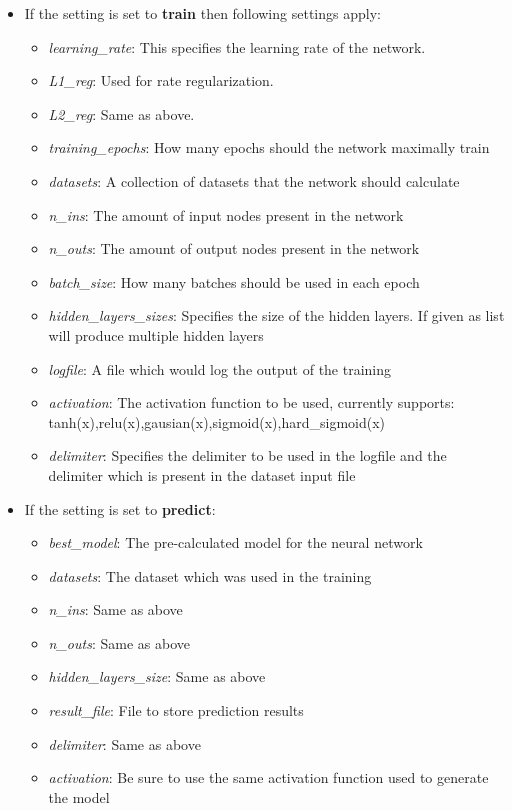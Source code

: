 \documentclass{article}
\begin{document}
\begin{itemize}
    \item If the setting is set to \textbf{train} then following settings apply:
    \begin{itemize}
        \item \emph{learning\_rate}: This specifies the learning rate of the network.
        \item \emph{L1\_reg}: Used for rate regularization. 
        \item \emph{L2\_reg}: Same as above.
        \item \emph{training\_epochs}: How many epochs should the network maximally train
        \item \emph{datasets}: A collection of datasets that the network should calculate
        \item \emph{n\_ins}: The amount of input nodes present in the network
        \item \emph{n\_outs}: The amount of output nodes present in the network
        \item \emph{batch\_size}: How many batches should be used in each epoch
        \item \emph{hidden\_layers\_sizes}: Specifies the size of the hidden layers. If given as list will produce multiple hidden layers
        \item \emph{logfile}: A file which would log the output of the training
        \item \emph{activation}: The activation function to be used, currently supports: tanh(x),relu(x),gausian(x),sigmoid(x),hard\_sigmoid(x)
        \item \emph{delimiter}: Specifies the delimiter to be used in the logfile and the delimiter which is present in the dataset input file
    \end{itemize}
    \item If the setting is set to \textbf{predict}:
        \begin{itemize}
            \item \emph{best\_model}: The pre-calculated model for the neural network
            \item \emph{datasets}: The dataset which was used in the training 
            \item \emph{n\_ins}: Same as above
            \item \emph{n\_outs}: Same as above
            \item \emph{hidden\_layers\_size}: Same as above
            \item \emph{result\_file}: File to store prediction results
            \item \emph{delimiter}: Same as above
            \item \emph{activation}: Be sure to use the same activation function used to generate the model
        \end{itemize}
\end{itemize}
\end{document}
